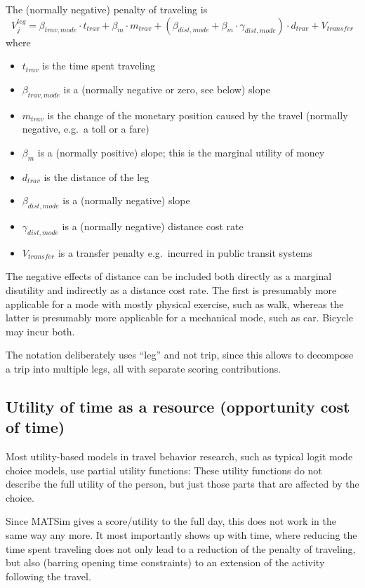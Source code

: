 The (normally negative) penalty of traveling is
\[
V^{leg}_j = \beta_{trav,mode} \cdot t_{trav} 
%
+ \beta_m \cdot m_{trav}
%
+ (\beta_{dist,mode} + \beta_m \cdot \gamma_{dist,mode}) \cdot d_{trav}
%
+ V_{transfer}
\]
where
\begin{itemize}
\item $t_{trav}$ is the time spent traveling
\item $\beta_{trav,mode}$ is a (normally negative or zero, see below) slope
\item $m_{trav}$ is the change of the monetary position caused by the travel (normally negative, e.g.\ a toll or a fare)
\item $\beta_m$ is a (normally positive) slope; this is the marginal utility of money
\item $d_{trav}$ is the distance of the leg
\item $\beta_{dist,mode}$ is a (normally negative) slope
\item $\gamma_{dist,mode}$ is a (normally negative) distance cost rate
\item $V_{transfer}$ is a transfer penalty e.g.\ incurred in public transit systems
\end{itemize}
The negative effects of distance can be included both directly as a marginal disutility and indirectly as a distance cost rate.  The first is presumably more applicable for a mode with mostly physical exercise, such as walk, whereas the latter is presumably more applicable for a mechanical mode, such as car.  Bicycle may incur both.

The notation deliberately uses ``leg'' and not trip, since this allows to decompose a trip into multiple legs, all with separate scoring contributions.

\subsection{Utility of time as a resource (opportunity cost of time)}
\label{sec:utl-of-time-as-resource}

Most utility-based models in travel behavior research, such as typical logit mode choice models, use partial utility functions: These utility functions do not describe the full utility of the person, but just those parts that are affected by the choice.

Since MATSim gives a score/utility to the full day, this does not work in the same way any more.  It most importantly shows up with time, where reducing the time spent traveling does not only lead to a reduction of the penalty of traveling, but also (barring opening time constraints) to an extension of the activity following the travel.

